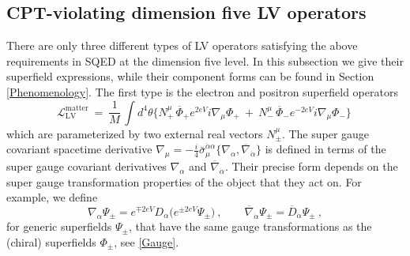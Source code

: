 \documentclass[12pt]{revtex4}
\begin{document}
\subsection{CPT-violating dimension five LV operators}
\label{Dim5LV}


There are only three different types of LV operators satisfying the 
above requirements in SQED at the
dimension five level. In this subsection we give their superfield
expressions, while their component forms can be found in Section
\ref{Phenomenology}. The first type is the electron and positron 
superfield operators  
\begin{equation}
\label{LV_matter}
  \mathcal{L}_{\mathrm{LV}}^{\mathrm{matter}} ~=~ 
\frac{1}{M}\,   \int d^4\theta \Big\{ 
N_+^\mu\, \overline{\Phi}_+ e^{2eV} i \nabla_\mu \Phi_+ 
~+~ N_{-}^\mu\, \overline{\Phi}_- e^{-2eV} i \nabla_\mu  {\Phi}_-
                 \Big\}~
\end{equation}
which are parameterized by two external real vectors $N_\pm^\mu$.  
The super gauge covariant spacetime derivative 
$\nabla_\mu   =  - \frac{i}{4} 
\bar{\sigma}_\mu^{\dot{\alpha}\alpha}
\{ \nabla_\alpha, \overline{\nabla}_{\dot{\alpha}} \} 
$ 
is defined in terms of the super gauge covariant derivatives 
$\nabla_\alpha$ and $\overline{\nabla}_{\dot{\alpha}}$. Their precise
form depends on the super gauge transformation properties of the
object that they act on. For example, we define 
\begin{equation}
\nabla_\alpha \Psi_\pm = 
e^{\mp 2eV} D_\alpha \big( e^{\pm 2eV} \Psi_\pm \big)~, 
\qquad 
\overline{\nabla}_{\dot{\alpha}} \Psi_\pm =
\overline{D}_{\dot{\alpha}} \Psi_\pm~,
\end{equation} 
for generic superfields $\Psi_\pm$, that have the same gauge
transformations as the (chiral) superfields $\Phi_\pm$, see 
\eqref{Gauge}. 
\end{document}
